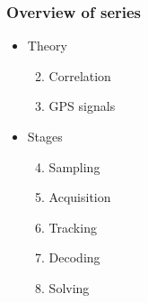 \documentclass[aspectratio=169, xcolor=table]{beamer}
\begin{document}
\begin{frame}
    \frametitle{Overview of series}

    \begin{itemize}
        \item<2-> Theory
        
        \begin{enumerate}
            \setcounter{enumi}{1}

            \item<3-> Correlation
           
            \item<4-> GPS signals
        \end{enumerate}

        \item<5-> Stages
        
        \begin{enumerate}
            \setcounter{enumi}{3}

            \item<6-> Sampling
            
            \item<7-> Acquisition
            
            \item<8-> Tracking
            
            \item<9-> Decoding
            
            \item<10-> Solving
        \end{enumerate}
    \end{itemize}
\end{frame}
\end{document}
